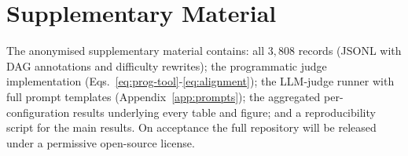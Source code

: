 \section*{Supplementary Material}
\label{sec:release}

The anonymised supplementary material contains: all $3{,}808$ records (JSONL with DAG annotations and difficulty rewrites); the programmatic judge implementation (Eqs.~\ref{eq:prog-tool}-\ref{eq:alignment}); the LLM-judge runner with full prompt templates (Appendix~\ref{app:prompts}); the aggregated per-configuration results underlying every table and figure; and a reproducibility script for the main results. On acceptance the full repository will be released under a permissive open-source license.